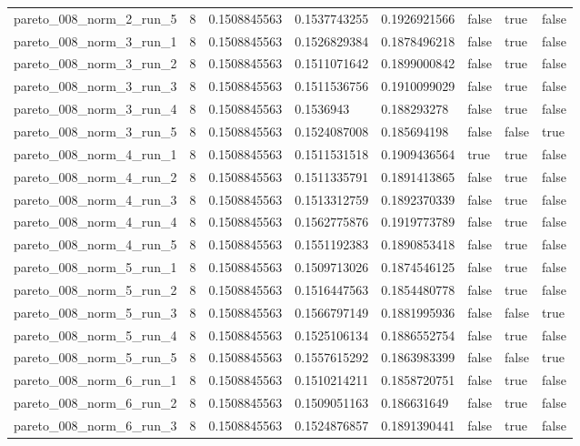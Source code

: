 \begin{tabular}{@{}llllllll@{}}
pareto\_008\_norm\_2\_run\_5 & 8 & 0.1508845563 & 0.1537743255 & 0.1926921566 & false & true & false \\
pareto\_008\_norm\_3\_run\_1 & 8 & 0.1508845563 & 0.1526829384 & 0.1878496218 & false & true & false \\
pareto\_008\_norm\_3\_run\_2 & 8 & 0.1508845563 & 0.1511071642 & 0.1899000842 & false & true & false \\
pareto\_008\_norm\_3\_run\_3 & 8 & 0.1508845563 & 0.1511536756 & 0.1910099029 & false & true & false \\
pareto\_008\_norm\_3\_run\_4 & 8 & 0.1508845563 & 0.1536943 & 0.188293278 & false & true & false \\
pareto\_008\_norm\_3\_run\_5 & 8 & 0.1508845563 & 0.1524087008 & 0.185694198 & false & false & true \\
pareto\_008\_norm\_4\_run\_1 & 8 & 0.1508845563 & 0.1511531518 & 0.1909436564 & true & true & false \\
pareto\_008\_norm\_4\_run\_2 & 8 & 0.1508845563 & 0.1511335791 & 0.1891413865 & false & true & false \\
pareto\_008\_norm\_4\_run\_3 & 8 & 0.1508845563 & 0.1513312759 & 0.1892370339 & false & true & false \\
pareto\_008\_norm\_4\_run\_4 & 8 & 0.1508845563 & 0.1562775876 & 0.1919773789 & false & true & false \\
pareto\_008\_norm\_4\_run\_5 & 8 & 0.1508845563 & 0.1551192383 & 0.1890853418 & false & true & false \\
pareto\_008\_norm\_5\_run\_1 & 8 & 0.1508845563 & 0.1509713026 & 0.1874546125 & false & true & false \\
pareto\_008\_norm\_5\_run\_2 & 8 & 0.1508845563 & 0.1516447563 & 0.1854480778 & false & true & false \\
pareto\_008\_norm\_5\_run\_3 & 8 & 0.1508845563 & 0.1566797149 & 0.1881995936 & false & false & true \\
pareto\_008\_norm\_5\_run\_4 & 8 & 0.1508845563 & 0.1525106134 & 0.1886552754 & false & true & false \\
pareto\_008\_norm\_5\_run\_5 & 8 & 0.1508845563 & 0.1557615292 & 0.1863983399 & false & false & true \\
pareto\_008\_norm\_6\_run\_1 & 8 & 0.1508845563 & 0.1510214211 & 0.1858720751 & false & true & false \\
pareto\_008\_norm\_6\_run\_2 & 8 & 0.1508845563 & 0.1509051163 & 0.186631649 & false & true & false \\
pareto\_008\_norm\_6\_run\_3 & 8 & 0.1508845563 & 0.1524876857 & 0.1891390441 & false & true & false \\

\end{tabular}
